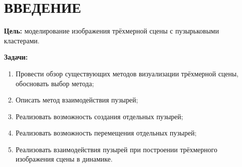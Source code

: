 \chapter*{ВВЕДЕНИЕ}
\textbf{Цель:} моделирование изображения трёхмерной сцены с пузырьковыми кластерами.

\textbf{Задачи:}
\begin{enumerate}[label={\arabic*)}]
	\item Провести обзор существующих методов визуализации трёхмерной сцены, обосновать выбор метода;
	\item Описать метод взаимодействия пузырей;
	\item Реализовать возможность создания отдельных пузырей;
	\item Реализовать возможность перемещения отдельных пузырей;
	\item Реализовать взаимодействия пузырей при построении трёхмерного изображения сцены в динамике.
\end{enumerate}
